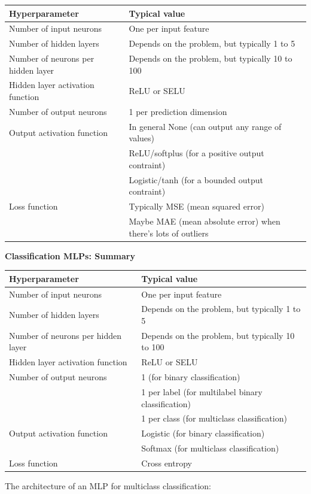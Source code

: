\begin{tabular}{ |l|l| } 
\hline
Hyperparameter & Typical value \\ 
\hline
Number of input neurons & One per input feature \\ 
Number of hidden layers & Depends on the problem, but typically 1 to 5\\ 
Number of neurons per hidden layer & Depends on the problem, but typically 10 to 100\\ 
Hidden layer activation function & ReLU or SELU\\
Number of output neurons & 1 per prediction dimension\\
Output activation function & In general None (can output any range of values)\\
 & ReLU/softplus (for a positive output contraint)\\
 & Logistic/tanh (for a bounded output contraint)\\
Loss function & Typically MSE (mean squared error)\\
 & Maybe MAE (mean absolute error) when there's lots of outliers\\
\hline
\end{tabular}

\textbf{Classification MLPs: Summary}

\begin{tabular}{ |l|l| } 
\hline
Hyperparameter & Typical value \\ 
\hline
Number of input neurons & One per input feature \\ 
Number of hidden layers & Depends on the problem, but typically 1 to 5\\ 
Number of neurons per hidden layer & Depends on the problem, but typically 10 to 100\\ 
Hidden layer activation function & ReLU or SELU\\
Number of output neurons & 1 (for binary classification)\\
 & 1 per label (for multilabel binary classification)\\
 & 1 per class (for multiclass classification)\\
Output activation function & Logistic (for binary classification)\\
 & Softmax (for multiclass classification)\\
Loss function & Cross entropy\\
\hline
\end{tabular}

\newpage
The architecture of an MLP for multiclass classification:

